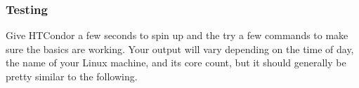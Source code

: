 
\subsubsection{Testing}
\label{sec:clouds-user-guide-testing}

Give HTCondor a few seconds to spin up and the try a few commands to make sure
the basics are working.  Your output will vary depending on the time of day,
the name of your Linux machine, and its core count, but it should generally be
pretty similar to the following.

